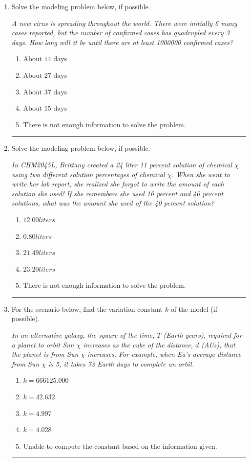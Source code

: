 \documentclass[14pt]{extbook}
\newcommand{\litem}[1]{\item#1\hspace*{-1cm}\rule{\textwidth}{0.4pt}}
\begin{document}
\begin{enumerate}
{\begin{enumerate}[label=\Alph*.]
\end{enumerate} }
\litem{
Solve the modeling problem below, if possible.
\begin{center}
    \textit{ A new virus is spreading throughout the world. There were initially 6 many cases reported, but the number of confirmed cases has quadrupled every 3 days. How long will it be until there are at least 1000000 confirmed cases? }
\end{center}
\begin{enumerate}[label=\Alph*.]
\item \( \text{About } 14 \text{ days} \)
\item \( \text{About } 27 \text{ days} \)
\item \( \text{About } 37 \text{ days} \)
\item \( \text{About } 15 \text{ days} \)
\item \( \text{There is not enough information to solve the problem.} \)

\end{enumerate} }
\litem{
Solve the modeling problem below, if possible.
\begin{center}
    \textit{ In CHM2045L, Brittany created a 24 liter 11 percent solution of chemical $\chi$ using two different solution percentages of chemical $\chi$. When she went to write her lab report, she realized she forgot to write the amount of each solution she used! If she remembers she used 10 percent and 40 percent solutions, what was the amount she used of the 40 percent solution? }
\end{center}
\begin{enumerate}[label=\Alph*.]
\item \( 12.00 liters \)
\item \( 0.80 liters \)
\item \( 21.49 liters \)
\item \( 23.20 liters \)
\item \( \text{There is not enough information to solve the problem.} \)

\end{enumerate} }
\litem{
For the scenario below, find the variation constant $k$ of the model (if possible).
\begin{center}
    \textit{ In an alternative galaxy, the square of the time, $T$ (Earth years), required for a planet to orbit Sun $\chi$ increases as the cube of the distance, $d$ (AUs), that the planet is from Sun $\chi$ increases. For example, when Ea's average distance from Sun $\chi$ is 5, it takes 73 Earth days to complete an orbit. }
\end{center}
\begin{enumerate}[label=\Alph*.]
\item \( k = 666125.000 \)
\item \( k = 42.632 \)
\item \( k = 4.997 \)
\item \( k = 4.028 \)
\item \( \text{Unable to compute the constant based on the information given.} \)

\end{enumerate} }
\end{enumerate}
\end{document}
